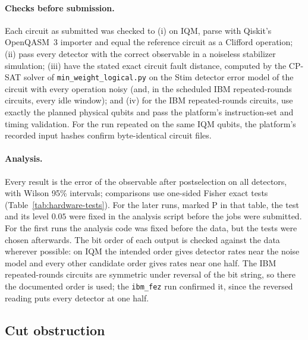 \documentclass[aps,prx,reprint,superscriptaddress,nofootinbib,floatfix,longbibliography]{revtex4-2}
\theoremstyle{definition}
\begin{document}
\paragraph{Checks before submission.}
Each circuit as submitted was checked to (i) on IQM, parse with Qiskit's
OpenQASM~3 importer and equal the reference circuit as a Clifford operation;
(ii) pass every detector with the correct observable in a noiseless
stabilizer simulation; (iii) have the stated exact circuit fault distance,
computed by the CP-SAT solver of \texttt{min\_weight\_logical.py} on the Stim
detector error model of the circuit with every operation noisy (and, in the
scheduled IBM repeated-rounds circuits, every idle window); and (iv) for the
IBM repeated-rounds circuits, use exactly the planned physical qubits and
pass the platform's instruction-set and timing validation.  For the run repeated on
the same IQM qubits, the platform's recorded input hashes confirm
byte-identical circuit files.

\paragraph{Analysis.}
Every result is the error of the observable after postselection on all
detectors, with Wilson 95\% intervals; comparisons use one-sided Fisher exact
tests (Table~\ref{tab:hardware-tests}).  For the later runs, marked P in that
table, the test and its level $0.05$ were fixed in the analysis script before
the jobs were submitted.  For the first runs the analysis code was fixed
before the data, but the tests were chosen afterwards.  The bit order of each
output is checked against the data wherever possible: on IQM the intended
order gives detector rates near the noise model and every other candidate
order gives rates near one half.  The IBM repeated-rounds circuits are
symmetric under reversal of the bit string, so there the documented order is
used; the \texttt{ibm\_fez} run confirmed it, since the reversed reading puts
every detector at one half.

\subsection{Cut obstruction}
\end{document}
